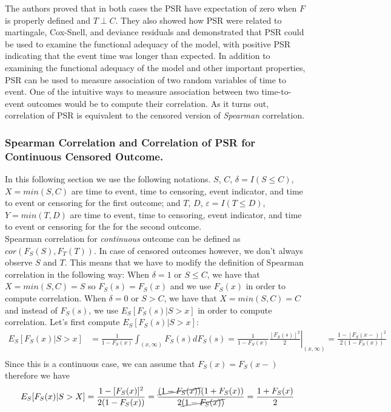 \documentclass[]{article}
\let\epsilon\varepsilon
\begin{document}
The authors proved that in both cases the PSR have expectation of zero when $F$ is properly defined and $T \perp C$. They also showed how PSR were related to martingale, Cox-Snell, and deviance residuals and demonstrated that PSR could be used to examine the functional adequacy of the model, with positive PSR indicating that the event time was longer than expected. In addition to examining the functional adequacy of the model and other important properties, PSR can be used to measure association of two random variables of time to event. One of the intuitive ways to measure association between two time-to-event outcomes would be to compute their correlation. As it turns out, correlation of PSR is equivalent to the censored version of \emph{Spearman} correlation.

\subsubsection{Spearman Correlation and Correlation of PSR for Continuous Censored Outcome.}
In this following section we use the following notations. $S$, $C$, $\delta=I(S\leq C)$, $X = min(S, C)$ are time to event, time to censoring, event indicator, and time to event or censoring for the first outcome; and $T$, $D$, $\epsilon=I(T\leq D)$, $Y = min(T, D)$ are time to event, time to censoring, event indicator, and time to event or censoring for the for the second outcome.\\
Spearman correlation for \emph{continuous} outcome can be defined as $cor(F_S(S), F_T(T))$. In case of censored outcomes however, we don't always observe $S$ and $T$. This means that we have to modify the definition of Spearman correlation in the following way: When $\delta = 1$ or $S\leq C$, we have that $X = min(S, C)=S$ so $F_S(s)=F_S(x)$ and we use $F_S(x)$ in order to compute correlation. When $\delta = 0$ or $S > C$, we have that $X = min(S, C)=C$ and instead of $F_S(s)$, we use $E_S[F_S(s)|S>x]$ in order to compute correlation. Let's first compute $E_S[F_S(s)|S>x]$:
	$$
	\begin{aligned}
		E_S[F_S(x)|S>x] &= \frac{1}{1-F_S(x)}\int_{(x, \infty)} F_S(s)dF_S(s) = \frac{1}{1-F_S(x)} \left.\frac{ [F_S(s)]^2}{2}\right|_{(x, \infty)} = \frac{1-[F_S(x-)]^2}{2(1-F_S(x))} \\
	\end{aligned}
	$$
Since this is a continuous case, we can assume that $F_S(x)=F_S(x-)$ therefore we have
	$$
	\begin{aligned}
		E_S[F_S(x)|S>X] &=\frac{1-[F_S(x)]^2}{2(1-F_S(x))}=\frac{\cancel{(1-F_S(x))}(1+F_S(x))}{2\cancel{(1-F_S(x))}}  = \frac{1+F_S(x)}{2} \\
	\end{aligned}
	$$
\end{document}
